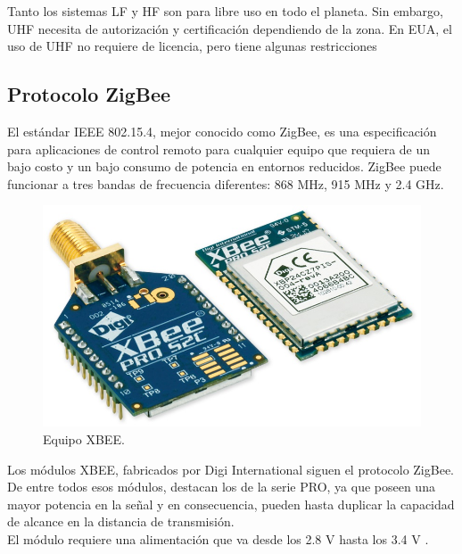 Tanto los sistemas LF y HF son para libre uso en todo el planeta. Sin embargo, UHF necesita de autorización y certificación dependiendo de la zona. En EUA, el uso de UHF no requiere de licencia, pero tiene algunas restricciones \cite{tapia2007identificacion}

\subsection{Protocolo ZigBee}

El estándar IEEE 802.15.4, mejor conocido como ZigBee, es una especificación para aplicaciones de control remoto para cualquier equipo que requiera de un bajo costo y un bajo consumo de potencia en entornos reducidos. ZigBee puede funcionar a tres bandas de frecuencia diferentes: 868 MHz, 915 MHz y 2.4 GHz. \\

\begin{figure}[ht]
\centering
\includegraphics[scale=0.20]{Figures/xbee}
\caption[Equipo XBEE.]{Equipo XBEE\footnotemark.}
\label{fig:XBEE}
\end{figure}


Los módulos XBEE, fabricados por Digi International siguen el protocolo ZigBee. De entre todos esos módulos, destacan los de la serie PRO, ya que poseen una mayor potencia en la señal y en consecuencia, pueden hasta duplicar la capacidad de alcance en la distancia de transmisión. \\

El módulo requiere una alimentación que va desde los 2.8 V hasta los 3.4 V \cite{oyarce2010guia}.

